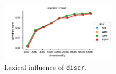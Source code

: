 \begin{figure}[h]
  \centering

  \includegraphics[width=0.5\textwidth]{supplement/figures/lexical-interaction-discr}

  \caption{Lexical influence of \texttt{discr}.}
  \label{fig:lexical-discr}
\end{figure}
